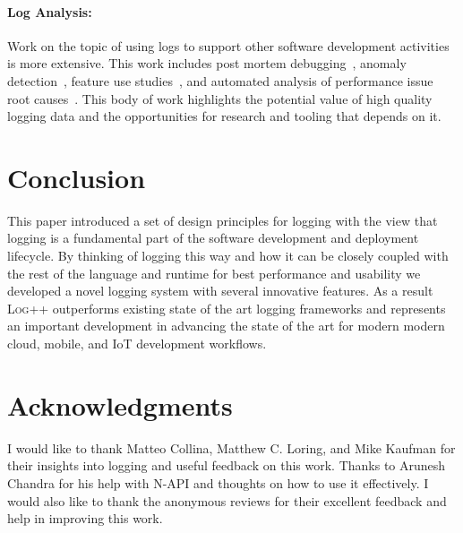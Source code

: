 \documentclass[sigplan,10pt]{acmart}
\newcommand{\projn}{\textsc{Log++}\xspace}
\begin{document}
\paragraph{Log Analysis:}
\noindent
Work on the topic of using logs to support other software development activities is 
more extensive. This work includes post mortem debugging~\cite{loganalysis,sherlog,autolog}, anomaly 
detection~\cite{detection}, feature use studies~\cite{twitter}, and automated analysis of performance 
issue root causes~\cite{performance}. 
This body of work highlights the potential value of high quality logging data and the 
opportunities for research and tooling that depends on it.

\section{Conclusion}
This paper introduced a set of design principles for logging with the view that 
logging is a fundamental part of the software development and deployment lifecycle. 
By thinking of logging this way and how it can be closely coupled with the rest of the 
language and runtime for best performance and usability we developed a novel logging 
system with several innovative features. 
As a result \projn outperforms existing state of the art logging frameworks and 
represents an important development in advancing the state of the art for 
modern modern cloud, mobile, and IoT development workflows.

\section*{Acknowledgments}
I would like to thank Matteo Collina, Matthew C. Loring, and Mike Kaufman for their insights into logging and 
useful feedback on this work. Thanks to Arunesh Chandra for his help with N-API and thoughts on how to 
use it effectively. I would also like to thank the anonymous reviews for their excellent feedback and help in improving this work.

\balance

{
\raggedright 

 
}
\end{document}
